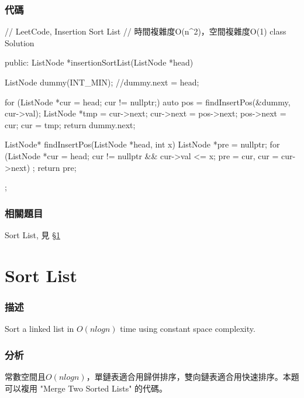 \subsubsection{代碼}
\begin{Code}
// LeetCode, Insertion Sort List
// 時間複雜度O(n^2)，空間複雜度O(1)
class Solution {
public:
    ListNode *insertionSortList(ListNode *head) {
        ListNode dummy(INT_MIN);
        //dummy.next = head;

        for (ListNode *cur = head; cur != nullptr;) {
            auto pos = findInsertPos(&dummy, cur->val);
            ListNode *tmp = cur->next;
            cur->next = pos->next;
            pos->next = cur;
            cur = tmp;
        }
        return dummy.next;
    }

    ListNode* findInsertPos(ListNode *head, int x) {
        ListNode *pre = nullptr;
        for (ListNode *cur = head; cur != nullptr && cur->val <= x;
            pre = cur, cur = cur->next)
            ;
        return pre;
    }
};
\end{Code}


\subsubsection{相關題目}
\begindot
\item Sort List, 見 \S \ref{sec:sort-list}
\myenddot


\section{Sort List} %
\label{sec:sort-list}


\subsubsection{描述}
Sort a linked list in $O(n log n)$ time using constant space complexity.


\subsubsection{分析}
常數空間且$O(nlogn)$，單鏈表適合用歸併排序，雙向鏈表適合用快速排序。本題可以複用 "Merge Two Sorted Lists" 的代碼。


